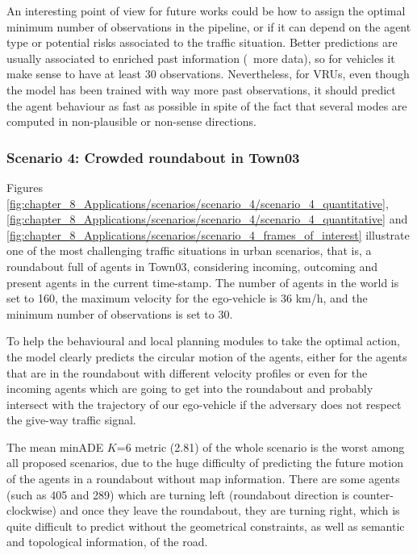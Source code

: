 An interesting point of view for future works could be how to assign the optimal minimum number of observations in the pipeline, or if it can depend on the agent type or potential risks associated to the traffic situation. Better predictions are usually associated to enriched past information (\ie \ more data), so for vehicles it make sense to have at least 30 observations. Nevertheless, for \acp{VRU}, even though the model has been trained with way more past observations, it should predict the agent behaviour as fast as possible in spite of the fact that several modes are computed in non-plausible or non-sense directions.

\subsubsection{Scenario 4: Crowded roundabout in Town03}
\label{subsubsec:8_experimental_results_scenario_4}

Figures \ref{fig:chapter_8_Applications/scenarios/scenario_4/scenario_4_quantitative}, \ref{fig:chapter_8_Applications/scenarios/scenario_4/scenario_4_quantitative} and \ref{fig:chapter_8_Applications/scenarios/scenario_4_frames_of_interest} illustrate one of the most challenging traffic situations in urban scenarios, that is, a roundabout full of agents in Town03, considering incoming, outcoming and present agents in the current time-stamp. The number of agents in the world is set to 160, the maximum velocity for the ego-vehicle is 36 km/h, and the minimum number of observations is set to 30. 

To help the behavioural and local planning modules to take the optimal action, the model clearly predicts the circular motion of the agents, either for the agents that are in the roundabout with different velocity profiles or even for the incoming agents which are going to get into the roundabout and probably intersect with the trajectory of our ego-vehicle if the adversary does not respect the give-way traffic signal.

The mean \ac{minADE} $K$=6 metric (2.81) of the whole scenario is the worst among all proposed scenarios, due to the huge difficulty of predicting the future motion of the agents in a roundabout without map information. There are some agents (such as 405 and 289) which are turning left (roundabout direction is counter-clockwise) and once they leave the roundabout, they are turning right, which is quite difficult to predict without the geometrical constraints, as well as semantic and topological information, of the road. 

